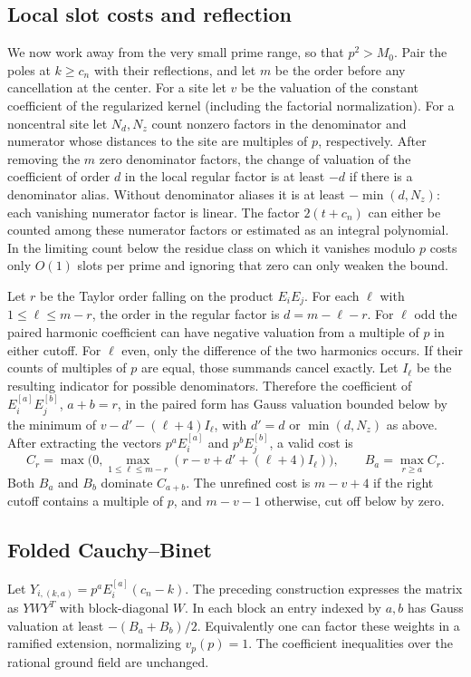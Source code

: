 \IfFileExists{TS1cmr.fd}{\documentclass[11pt]{article}}
\begin{document}
\subsection{Local slot costs and reflection}
We now work away from the very small prime range, so that
\(p^2>M_0\). Pair the poles at \(k\ge c_n\) with their reflections,
and let \(m\) be the order before any cancellation at the center.
For a site let \(v\) be the valuation of the constant coefficient
of the regularized kernel (including the factorial normalization).
For a noncentral site let \(N_d,N_z\) count nonzero factors in
the denominator and numerator whose distances to the site are
multiples of \(p\), respectively. After removing the \(m\)
zero denominator factors, the change of valuation of the
coefficient of order \(d\) in the local regular factor is at
least \(-d\) if there is a denominator alias. Without denominator
aliases it is at least \(-\min(d,N_z)\): each vanishing numerator
factor is linear. The factor \(2(t+c_n)\) can either be counted
among these numerator factors or estimated as an integral
polynomial. In the limiting count below the residue class on
which it vanishes modulo \(p\) costs only \(O(1)\) slots per prime
and ignoring that zero can only weaken the bound.

Let \(r\) be the Taylor order falling on the product
\(E_iE_j\). For each \(\ell\) with \(1\le\ell\le m-r\), the
order in the regular factor is \(d=m-\ell-r\).
For \(\ell\) odd the paired harmonic coefficient can have
negative valuation from a multiple of \(p\) in either cutoff.
For \(\ell\) even, only the difference of the two harmonics
occurs. If their counts of multiples of \(p\) are equal, those
summands cancel exactly. Let \(I_\ell\) be the resulting
indicator for possible denominators. Therefore the
coefficient of \(E_i^{[a]}E_j^{[b]}\), \(a+b=r\), in the
paired form has Gauss valuation bounded below by the minimum
of \(v-d'-(\ell+4)I_\ell\), with \(d'=d\) or
\(\min(d,N_z)\) as above. After extracting the vectors
\(p^a E_i^{[a]}\) and \(p^b E_j^{[b]}\), a valid cost is
\[
 C_r=\max\bigl(0,\max_{1\le\ell\le m-r}
         (r-v+d'+(\ell+4)I_\ell)\bigr),
 \qquad B_a=\max_{r\ge a}C_r .
 \tag{6}
\]
Both \(B_a\) and \(B_b\) dominate \(C_{a+b}\).
The unrefined cost is \(m-v+4\) if the right cutoff contains
a multiple of \(p\), and \(m-v-1\) otherwise, cut off below by zero.

\subsection{Folded Cauchy--Binet}
Let \(Y_{i,(k,a)}=p^a E_i^{[a]}(c_n-k)\).
The preceding construction expresses the matrix as \(Y W Y^T\)
with block-diagonal \(W\). In each block an entry indexed by
\(a,b\) has Gauss valuation at least \(-(B_a+B_b)/2\).
Equivalently one can factor these weights in a ramified extension,
normalizing \(v_p(p)=1\). The coefficient inequalities over the
rational ground field are unchanged.
\end{document}
